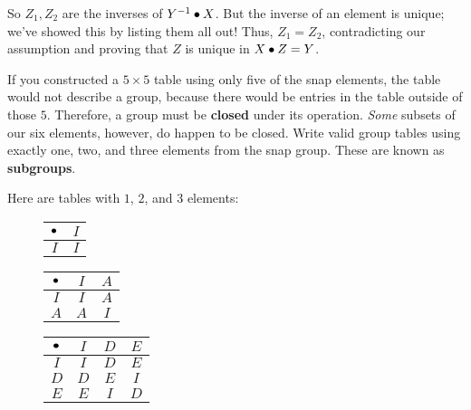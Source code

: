 \documentclass[../gatm_answers.tex]{subfiles}
\begin{document}
\noindent So $Z_1,Z_2$ are the inverses of $Y^{-1}\bullet X$. But the inverse of an element is unique; we've showed this by listing them all out! Thus, $Z_1=Z_2$, contradicting our assumption and proving that $Z$ is unique in $X\bullet Z = Y$.

\begin{outer_problem}
\item If you constructed a $5\times 5$ table using only five of the snap elements, the table would not describe a group, because there would be entries in the table outside of those $5$. Therefore, a group must be \textbf{closed} under its operation. \textit{Some} subsets of our six elements, however, do happen to be closed. Write valid group tables using exactly one, two, and three elements from the snap group. These are known as \textbf{subgroups}.\label{prob:group_definition_end}
\end{outer_problem}

Here are tables with $1$, $2$, and $3$ elements:
\begin{figure}[h]
	\begin{center}
		\begin{minipage}[t]{0.3\textwidth}
			\centering
			\begin{tabular}{c|c}
				\hline
				$\bullet$ & $I$ \\ \hline
				\rowcolor{light-gray}
				$I$ & $I$ \\ \hline
			\end{tabular}
			\vspace*{0.5\baselineskip}
		\end{minipage}
		\hfill
		\begin{minipage}[t]{0.3\textwidth}
			\centering
			\begin{tabular}{c|cc}
				\hline
				$\bullet$ & $I$ & $A$ \\ \hline
				\rowcolor{light-gray}
				$I$ & $I$ & $A$ \\
				$A$ & $A$ & $I$ \\ \hline
			\end{tabular}
			\vspace*{0.5\baselineskip}
		\end{minipage}
		\hfill
		\begin{minipage}[t]{0.3\textwidth}
			\centering
			\begin{tabular}{c|ccc}
				\hline
				$\bullet$ & $I$ & $D$ & $E$ \\ \hline
				\rowcolor{light-gray}
				$I$ & $I$ & $D$ & $E$ \\
				$D$ & $D$ & $E$ & $I$ \\
				\rowcolor{light-gray}
				$E$ & $E$ & $I$ & $D$ \\ \hline
			\end{tabular}
			\vspace*{0.5\baselineskip}
		\end{minipage}
	\end{center}
	\vspace*{-2\baselineskip}
\end{figure}
\end{document}

